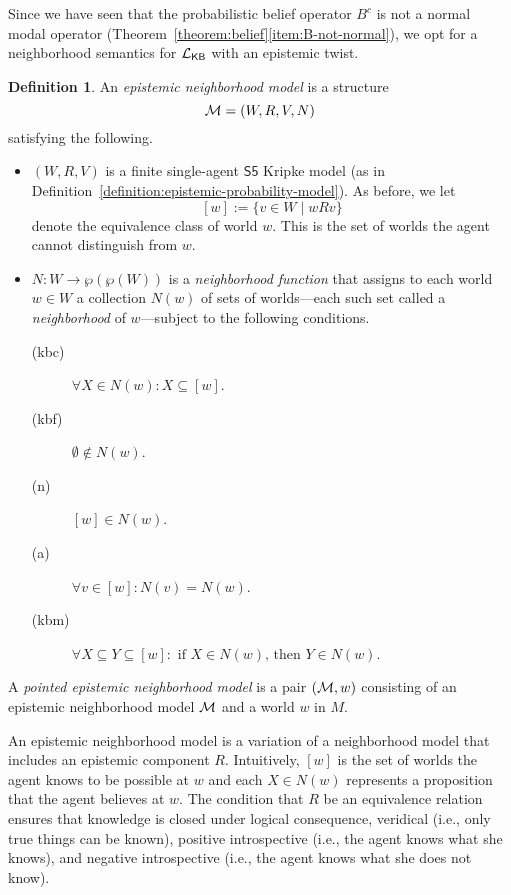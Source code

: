 \documentclass[12pt]{article}
\theoremstyle{definition}
\newtheorem{definition}[theorem]{Definition}
\newcommand{\M}{{\cal M}}      %
\newcommand{\Lang}{{\cal L}}   %
\newcommand{\KB}{{\mathsf{KB}}}                 %
\begin{document}
Since we have seen that the probabilistic belief operator $B^c$ is not
a normal modal operator
(Theorem~\ref{theorem:belief}\eqref{item:B-not-normal}), we opt for a
neighborhood semantics for $\Lang_\KB$ \cite[Ch.~7]{Chellas:ml} with
an epistemic twist.

\begin{definition} 
  An \emph{epistemic neighborhood model} is a structure
  \[
  \M=(W,R,V,N)
  \]
  satisfying the following.
  \begin{itemize}
  \item $(W,R,V)$ is a finite single-agent $\mathsf{S5}$ Kripke model
    (as in Definition~\ref{definition:epistemic-probability-model}).
    As before, we let
    \[
    [w]:=\{v\in W\mid wRv\}
    \]
    denote the equivalence class of world $w$.  This is the set of
    worlds the agent cannot distinguish from $w$.

  \item $N : W \to \wp(\wp(W))$ is a \emph{neighborhood function} that
    assigns to each world $w\in W$ a collection $N(w)$ of sets of
    worlds---each such set called a \emph{neighborhood} of
    $w$---subject to the following conditions.
    \begin{description}
    \item[(kbc)] $\forall X \in N(w) : X \subseteq [w]$.

    \item[(kbf)] $\emptyset\notin N(w)$.
      
    \item[(n)] $[w]\in N(w)$.
      
    \item[(a)] $\forall v \in [w] : N(v) = N(w)$.

    \item[(kbm)] $\forall X \subseteq Y \subseteq [w] : 
      \text{ if } X \in N(w) \text{, then } Y \in N(w)$.
   \end{description}
  \end{itemize}
  A \emph{pointed epistemic neighborhood model} is a pair $(\M,w)$
  consisting of an epistemic neighborhood model $\M$ and a world $w$
  in $M$.
\end{definition}

An epistemic neighborhood model is a variation of a neighborhood model
that includes an epistemic component $R$.  Intuitively, $[w]$ is the
set of worlds the agent knows to be possible at $w$ and each
$X\in N(w)$ represents a proposition that the agent believes at $w$.
The condition that $R$ be an equivalence relation ensures that
knowledge is closed under logical consequence, veridical (i.e., only
true things can be known), positive introspective (i.e., the agent
knows what she knows), and negative introspective (i.e., the agent
knows what she does not know).
\end{document}
